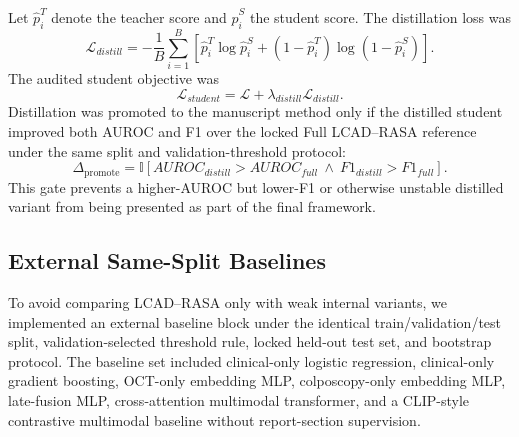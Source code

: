 Let \(\hat{p}_i^{T}\) denote the teacher score and \(\hat{p}_i^{S}\) the student score. The distillation loss was
\begin{equation}
\mathcal{L}_{distill}
=
-\frac{1}{B}
\sum_{i=1}^{B}
\left[
\hat{p}_i^{T}\log\hat{p}_i^{S}
+(1-\hat{p}_i^{T})\log(1-\hat{p}_i^{S})
\right].
\end{equation}
The audited student objective was
\begin{equation}
\mathcal{L}_{student}
=
\mathcal{L}
+
\lambda_{distill}\mathcal{L}_{distill}.
\end{equation}
Distillation was promoted to the manuscript method only if the distilled student improved both AUROC and F1 over the locked Full LCAD--RASA reference under the same split and validation-threshold protocol:
\begin{equation}
\Delta_{\mathrm{promote}}
=
\mathbb{I}\left[
AUROC_{distill}>AUROC_{full}
\ \land\
F1_{distill}>F1_{full}
\right].
\end{equation}
This gate prevents a higher-AUROC but lower-F1 or otherwise unstable distilled variant from being presented as part of the final framework.

\subsection{External Same-Split Baselines}
\label{subsec:methods_baselines}

To avoid comparing LCAD--RASA only with weak internal variants, we implemented an external baseline block under the identical train/validation/test split, validation-selected threshold rule, locked held-out test set, and bootstrap protocol. The baseline set included clinical-only logistic regression, clinical-only gradient boosting, OCT-only embedding MLP, colposcopy-only embedding MLP, late-fusion MLP, cross-attention multimodal transformer, and a CLIP-style contrastive multimodal baseline without report-section supervision.

